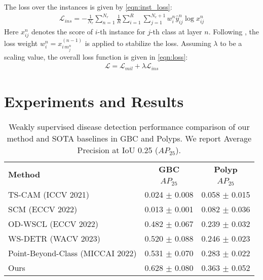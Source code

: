 \documentclass[runningheads]{llncs}
\begin{document}
The loss over the instances is given by \cref{eqn:inst_loss}:
\begin{align}
    \mathcal{L}_{ins} = - \frac{1}{N_r} \sum_{n=1}^{N_r} \frac{1}{R} \sum_{i=1}^R \sum_{j=1}^{N_c+1} w^{n}_{i} \hat{y}^{n}_{ij} \log x^n_{ij}
    \label{eqn:inst_loss}
\end{align}
Here $x^n_{ij}$ denotes the score of $i$-th instance for $j$-th class at layer $n$. Following \cite{oicr}, the loss weight $w^n_{i} = x^{(n-1)}_{i\,m^n_j}$ is applied to stabilize the loss.
Assuming $\lambda$ to be a scaling value, the overall loss function is given in \cref{eqn:loss}:
\begin{align}
    \mathcal{L} = \mathcal{L}_{mil} + \lambda\mathcal{L}_{ins} 
    \label{eqn:loss}
\end{align}

%
%
\section{Experiments and Results}

%
\begin{table}[t]
	\centering
	\setlength{\tabcolsep}{10pt}
	\caption{Weakly supervised disease detection performance comparison of our method and SOTA baselines in GBC and Polyps. We report Average Precision at IoU 0.25 ($AP_{25}$).}
	\begin{tabular}{lcc}
		\toprule
		\multirow{2}{*}{\textbf{Method}} & \textbf{GBC} & \textbf{Polyp} \\ 
        & $AP_{25}$ & $AP_{25}$ \\
        \midrule
        TS-CAM \cite{tscam} (ICCV 2021) & 0.024 $\pm$ 0.008 & 0.058 $\pm$ 0.015 \\
        SCM \cite{scm} (ECCV 2022) & 0.013 $\pm$ 0.001 & 0.082 $\pm$ 0.036 \\
        OD-WSCL \cite{odwscl} (ECCV 2022) & 0.482 $\pm$ 0.067 & 0.239 $\pm$ 0.032 \\
        WS-DETR \cite{wsdetr} (WACV 2023) & 0.520 $\pm$ 0.088 & 0.246 $\pm$ 0.023 \\
        Point-Beyond-Class \cite{pointdetr} (MICCAI 2022) & 0.531 $\pm$ 0.070 & 0.283 $\pm$ 0.022 \\
        \midrule
        Ours & 0.628 $\pm$ 0.080 & 0.363 $\pm$ 0.052 \\
        \bottomrule
    \end{tabular}
    \label{tab:wsod}
\end{table}
\end{document}
